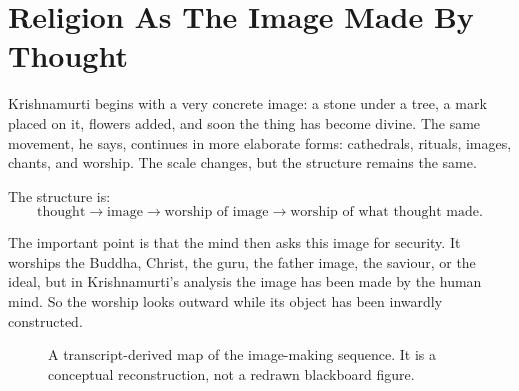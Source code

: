 \section{Religion As The Image Made By Thought}

Krishnamurti begins with a very concrete image: a stone under a tree, a mark placed on it, flowers added, and soon the thing has become divine. The same movement, he says, continues in more elaborate forms: cathedrals, rituals, images, chants, and worship. The scale changes, but the structure remains the same.

The structure is:
\begin{equation}
\text{thought}
\longrightarrow
\text{image}
\longrightarrow
\text{worship of image}
\longrightarrow
\text{worship of what thought made}.
\end{equation}

The important point is that the mind then asks this image for security. It worships the Buddha, Christ, the guru, the father image, the saviour, or the ideal, but in Krishnamurti's analysis the image has been made by the human mind. So the worship looks outward while its object has been inwardly constructed.

\begin{figure}
\centering
{}
\caption{A transcript-derived map of the image-making sequence. It is a conceptual reconstruction, not a redrawn blackboard figure.}
\end{figure}

